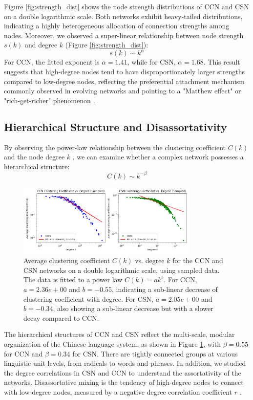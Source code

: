 \documentclass[11pt]{article}
\begin{document}
    Figure \ref{fig:strength_dist} shows the node strength distributions of CCN and CSN on a double logarithmic scale. Both networks exhibit heavy-tailed distributions, indicating a highly heterogeneous allocation of connection strengths among nodes. 
    Moreover, we observed a super-linear relationship between node strength $s(k)$ and degree $k$ (Figure \ref{fig:strength_dist}):
    \begin{equation}
    s(k) \sim k^{\alpha}
    \end{equation}
    For CCN, the fitted exponent is $\alpha=1.41$, while for CSN, $\alpha=1.68$. This result suggests that high-degree nodes tend to have disproportionately larger strengths compared to low-degree nodes, reflecting the preferential attachment mechanism commonly observed in evolving networks and pointing to a "Matthew effect" or "rich-get-richer" phenomenon \cite{Barabasi1999}.
\subsection{Hierarchical Structure and Disassortativity}
By observing the power-law relationship between the clustering coefficient $C(k)$ and the node degree $k$ \cite{Ravasz2003}, we can examine whether a complex network possesses a hierarchical structure:
\begin{equation}
C(k) \sim k^{-\beta}
\end{equation}
\begin{figure}[htbp]
    \centering
    \includegraphics[width=0.8\textwidth]{../analysis/clustering coefficient/clustering coefficient.png}
    \caption{Average clustering coefficient $C(k)$ vs. degree $k$ for the CCN and CSN networks on a double logarithmic scale, using sampled data. The data is fitted to a power law $C(k) = ak^b$. For CCN, $a=2.36e+00$ and $b=-0.55$, indicating a sub-linear decrease of clustering coefficient with degree. For CSN, $a=2.05e+00$ and $b=-0.34$, also showing a sub-linear decrease but with a slower decay compared to CCN.}
    \label{fig:hierarchical}
    \end{figure}
    The hierarchical structures of CCN and CSN reflect the multi-scale, modular organization of the Chinese language system, as shown in Figure \ref{fig:hierarchical}, with $\beta=0.55$ for CCN and $\beta=0.34$ for CSN. There are tightly connected groups at various linguistic unit levels, from radicals to words and phrases.
    In addition, we studied the degree correlations in CSN and CCN to understand the assortativity of the networks. Disassortative mixing is the tendency of high-degree nodes to connect with low-degree nodes, measured by a negative degree correlation coefficient $r$ \cite{Newman2002}.
    
\end{document}
